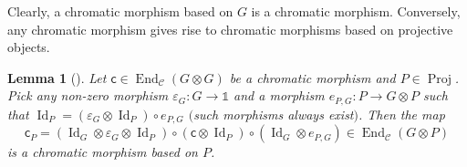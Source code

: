 \documentclass[10pt,a4paper]{amsart}
\newtheorem{lemma}{Lemma}
\numberwithin{equation}{section}
\newcommand{\Proj}{\operatorname{Proj}}
\newcommand{\chr}{{\mathsf{c}}}
\numberwithin{theorem}{section}
\numberwithin{proposition}{section}
\numberwithin{definition}{section}
\numberwithin{lemma}{section}
\numberwithin{corollary}{section}
\numberwithin{remark}{section}
\numberwithin{example}{section}
\newcommand{\cat}{\mathcal{C}}
\newcommand{\End}{\operatorname{End}}
\newcommand{\unit}{\ensuremath{\mathds{1}}}
\newcommand{\Id}{\operatorname{Id}}
\newcommand{\ve}{\varepsilon}
\begin{document}
 Clearly, a chromatic morphism based on $G$ is a chromatic morphism. Conversely,
any chromatic morphism gives rise to chromatic morphisms based on
projective objects.
\begin{lemma}[{\cite[Lemma 1.2]{CGPV2023a}}]
 Let $\chr\in\End_\cat(G\otimes G)$ be a chromatic morphism and
 ${P\in\Proj}$. Pick any non-zero morphism $\ve_G\colon G\to\unit$ and a
 morphism ${{e}}_{P,G}\colon P\to G\otimes P$ such that
 $\Id_P=(\ve_G\otimes\Id_P)\circ{{e}}_{P,G}$ $($such morphisms always
 exist$)$. Then the map
 \begin{equation*}
 {{\chr}}_P=
 (\Id_{G}\otimes\ve_G\otimes\Id_P)\circ(\chr\otimes\Id_P)\circ(\Id_{G}\otimes{{e}}_{P,G}) \in \End_\cat(G\otimes P)
 \end{equation*}
 is a chromatic morphism based on $P$.
\end{lemma}
\end{document}
